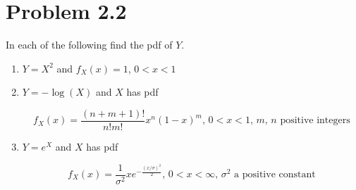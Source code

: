 \documentclass[12pt,letterpaper,reqno]{amsart}
\numberwithin{equation}{subsection}
\begin{document}
\newpage
\section{Problem 2.2}

In each of the following find the pdf of $Y$.

\begin{enumerate}[label=(\alph*),leftmargin=*]
    \item $Y = X^2$ and $f_X(x) = 1$, $0 < x < 1$
    \item $Y = -\log(X)$ and $X$ has pdf
    
    \[ \mbox{$f_X(x) = \frac{(n+m+1)!}{n!m!}x^n (1-x)^m$, $0<x<1$, $m$, $n$ positive integers} \]
    
    \item $Y = e^X$ and $X$ has pdf
    
    \[ \mbox{$f_X(x) = \frac{1}{\sigma^2} xe^{-\frac{(x/\sigma)^2}{2}}$, $0< x< \infty$, $\sigma^2$ a positive constant} \]
\end{enumerate}~\\
\end{document}
